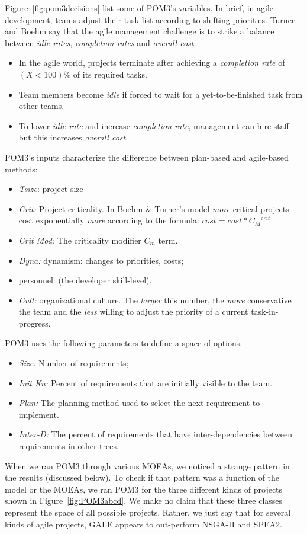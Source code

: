\documentclass[10pt,journal,compsoc]{IEEEtran}
\newcommand{\bi}{\begin{itemize}}
\newcommand{\ei}{\end{itemize}}
\newcommand{\fig}[1]{Figure~\ref{fig:#1}}
\begin{document}
\fig{pom3decisions}  list some of POM3's variables.
In brief, 
in agile development, 
teams adjust
their task list according to shifting priorities.
Turner and Boehm say that the agile
management challenge is to strike a balance between {\em idle rates},
{\em completion rates} and {\em overall cost}. 
\bi
\item
In the agile world, projects terminate after achieving a 
{\em completion rate} of   $(X<100)$\% of its required tasks.
\item
Team members  become
{\em idle} if forced to wait for a yet-to-be-finished task from other teams. 
\item
To lower {\em idle rate} and  
increase {\em completion rate}, management can hire staff- but this
increases  {\em overall cost}.
\ei

POM3's inputs characterize the difference
between plan-based and agile-based methods:
\bi
\item {\em Tsize}: project size
\item {\em Crit:} Project criticality. In Boehm \& Turner's model
 {\em more} critical projects cost exponentially {\em more} 
according to the formula: $\textit{cost} = \textit{cost} * {C_M}^{\textit{crit}}$.
\item {\em Crit Mod:} The criticality modifier $C_m$ term.
\item {\em Dyna:} dynamism: changes to priorities, costs;
\item personnel: (the developer skill-level).
\item  {\em Cult:} organizational culture. The {\em larger} this number, the {\em more} conservative
the team and the {\em less} willing to adjust the priority of a current task-in-progress.
\ei
POM3 uses the following parameters to define a space of options.
\bi
\item {\em Size:} Number of requirements;
\item {\em Init Kn:} Percent of requirements that are initially visible to the team.
\item {\em Plan:} The planning method used to select the next requirement to implement.
\item {\em Inter-D:}  The percent of requirements that have inter-dependencies 
between requirements in other trees.
\ei


When we ran POM3 through various MOEAs, we noticed a strange pattern in the results
(discussed below). To check if that pattern was a function of the model or the MOEAs,
we ran POM3 for the three different kinds of projects shown in \fig{POM3abcd}.
We make no claim that these three classes represent the space of all possible projects.
Rather, we just say that for several kinds of agile projects,
GALE appears to out-perform NSGA-II and SPEA2.
\end{document}
